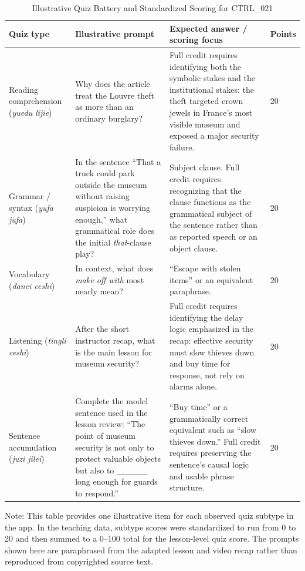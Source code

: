 \begin{table}[H]
\centering
\begin{threeparttable}
\caption{Illustrative Quiz Battery and Standardized Scoring for CTRL\_021}
\label{tab:illustrative_quiz}
\scriptsize
\setlength{\tabcolsep}{4pt}
\begin{tabularx}{\textwidth}{p{2.6cm}X p{3.8cm} p{1.3cm}}
\toprule
Quiz type & Illustrative prompt & Expected answer / scoring focus & Points \\
\midrule
Reading comprehension (\textit{yuedu lijie}) & Why does the article treat the Louvre theft as more than an ordinary burglary? & Full credit requires identifying both the symbolic stakes and the institutional stakes: the theft targeted crown jewels in France's most visible museum and exposed a major security failure. & 20 \\
\addlinespace
Grammar / syntax (\textit{yufa jufa}) & In the sentence ``That a truck could park outside the museum without raising suspicion is worrying enough,'' what grammatical role does the initial \textit{that}-clause play? & Subject clause. Full credit requires recognizing that the clause functions as the grammatical subject of the sentence rather than as reported speech or an object clause. & 20 \\
\addlinespace
Vocabulary (\textit{danci ceshi}) & In context, what does \textit{make off with} most nearly mean? & ``Escape with stolen items'' or an equivalent paraphrase. & 20 \\
\addlinespace
Listening (\textit{tingli ceshi}) & After the short instructor recap, what is the main lesson for museum security? & Full credit requires identifying the delay logic emphasized in the recap: effective security must slow thieves down and buy time for response, not rely on alarms alone. & 20 \\
\addlinespace
Sentence accumulation (\textit{juzi jilei}) & Complete the model sentence used in the lesson review: ``The point of museum security is not only to protect valuable objects but also to \_\_\_\_\_ long enough for guards to respond.'' & ``Buy time'' or a grammatically correct equivalent such as ``slow thieves down.'' Full credit requires preserving the sentence's causal logic and usable phrase structure. & 20 \\
\bottomrule
\end{tabularx}
\begin{tablenotes}[flushleft]
\footnotesize
\item Note: This table provides one illustrative item for each observed quiz subtype in the app. In the teaching data, subtype scores were standardized to run from 0 to 20 and then summed to a 0--100 total for the lesson-level quiz score. The prompts shown here are paraphrased from the adapted lesson and video recap rather than reproduced from copyrighted source text.
\end{tablenotes}
\end{threeparttable}
\end{table}
